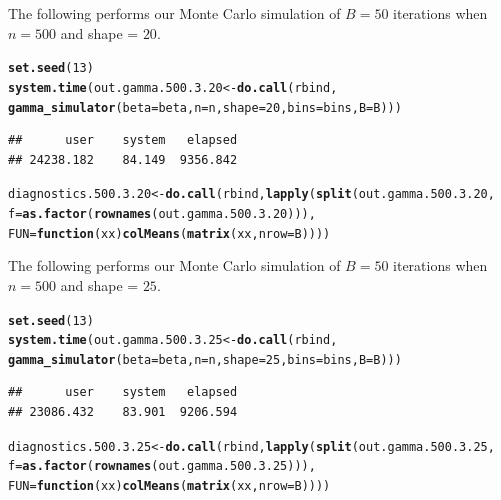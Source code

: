 \documentclass[11pt]{article}\usepackage[]{graphicx}\usepackage[]{color}
\makeatletter
\newcommand{\hlnum}[1]{\textcolor[rgb]{0.686,0.059,0.569}{#1}}%
\newcommand{\hlstd}[1]{\textcolor[rgb]{0.345,0.345,0.345}{#1}}%
\newcommand{\hlkwa}[1]{\textcolor[rgb]{0.161,0.373,0.58}{\textbf{#1}}}%
\newcommand{\hlkwb}[1]{\textcolor[rgb]{0.69,0.353,0.396}{#1}}%
\newcommand{\hlkwc}[1]{\textcolor[rgb]{0.333,0.667,0.333}{#1}}%
\newcommand{\hlkwd}[1]{\textcolor[rgb]{0.737,0.353,0.396}{\textbf{#1}}}%
\newenvironment{kframe}{%
 \def\at@end@of@kframe{}%
 \ifinner\ifhmode%
  \def\at@end@of@kframe{\end{minipage}}%
  \begin{minipage}{\columnwidth}%
 \fi\fi%
 \def\FrameCommand##1{\hskip\@totalleftmargin \hskip-\fboxsep
 \colorbox{shadecolor}{##1}\hskip-\fboxsep
     \hskip-\linewidth \hskip-\@totalleftmargin \hskip\columnwidth}%
 \MakeFramed {\advance\hsize-\width
   \@totalleftmargin\z@ \linewidth\hsize
   \@setminipage}}%
 {\par\unskip\endMakeFramed%
 \at@end@of@kframe}
\newenvironment{knitrout}{}{} %
\makeatother
\begin{document}
The following performs our Monte Carlo simulation of $B = 50$ iterations 
when $n = 500$ and shape = $20$.

\begin{knitrout}
\color{fgcolor}\begin{kframe}
\begin{alltt}
\hlkwd{set.seed}\hlstd{(}\hlnum{13}\hlstd{)}
\hlkwd{system.time}\hlstd{(out.gamma.500.3.20} \hlkwb{<-} \hlkwd{do.call}\hlstd{(rbind,}
  \hlkwd{gamma_simulator}\hlstd{(}\hlkwc{beta} \hlstd{= beta,} \hlkwc{n} \hlstd{= n,} \hlkwc{shape} \hlstd{=} \hlnum{20}\hlstd{,} \hlkwc{bins} \hlstd{= bins,} \hlkwc{B} \hlstd{= B)))}
\end{alltt}
\begin{verbatim}
##      user    system   elapsed 
## 24238.182    84.149  9356.842
\end{verbatim}
\begin{alltt}
\hlstd{diagnostics.500.3.20} \hlkwb{<-} \hlkwd{do.call}\hlstd{(rbind,} \hlkwd{lapply}\hlstd{(}\hlkwd{split}\hlstd{(out.gamma.500.3.20,}
  \hlkwc{f} \hlstd{=} \hlkwd{as.factor}\hlstd{(}\hlkwd{rownames}\hlstd{(out.gamma.500.3.20))),}
  \hlkwc{FUN} \hlstd{=} \hlkwa{function}\hlstd{(}\hlkwc{xx}\hlstd{)} \hlkwd{colMeans}\hlstd{(}\hlkwd{matrix}\hlstd{(xx,} \hlkwc{nrow} \hlstd{= B))))}
\end{alltt}
\end{kframe}
\end{knitrout}

The following performs our Monte Carlo simulation of $B = 50$ iterations 
when $n = 500$ and shape = $25$.

\begin{knitrout}
\color{fgcolor}\begin{kframe}
\begin{alltt}
\hlkwd{set.seed}\hlstd{(}\hlnum{13}\hlstd{)}
\hlkwd{system.time}\hlstd{(out.gamma.500.3.25} \hlkwb{<-} \hlkwd{do.call}\hlstd{(rbind,}
  \hlkwd{gamma_simulator}\hlstd{(}\hlkwc{beta} \hlstd{= beta,} \hlkwc{n} \hlstd{= n,} \hlkwc{shape} \hlstd{=} \hlnum{25}\hlstd{,} \hlkwc{bins} \hlstd{= bins,} \hlkwc{B} \hlstd{= B)))}
\end{alltt}
\begin{verbatim}
##      user    system   elapsed 
## 23086.432    83.901  9206.594
\end{verbatim}
\begin{alltt}
\hlstd{diagnostics.500.3.25} \hlkwb{<-} \hlkwd{do.call}\hlstd{(rbind,} \hlkwd{lapply}\hlstd{(}\hlkwd{split}\hlstd{(out.gamma.500.3.25,}
  \hlkwc{f} \hlstd{=} \hlkwd{as.factor}\hlstd{(}\hlkwd{rownames}\hlstd{(out.gamma.500.3.25))),}
  \hlkwc{FUN} \hlstd{=} \hlkwa{function}\hlstd{(}\hlkwc{xx}\hlstd{)} \hlkwd{colMeans}\hlstd{(}\hlkwd{matrix}\hlstd{(xx,} \hlkwc{nrow} \hlstd{= B))))}
\end{alltt}
\end{kframe}
\end{knitrout}
\end{document}
